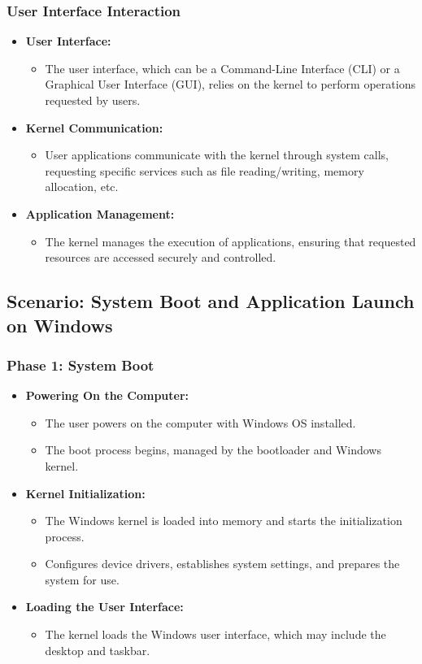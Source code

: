 \subsubsection{User Interface Interaction}
\begin{itemize}
    \item \textbf{User Interface:}
    \begin{itemize}
        \item The user interface, which can be a Command-Line Interface (CLI) or a Graphical User Interface (GUI), relies on the kernel to perform operations requested by users.
    \end{itemize}
    \item \textbf{Kernel Communication:}
    \begin{itemize}
        \item User applications communicate with the kernel through system calls, requesting specific services such as file reading/writing, memory allocation, etc.
    \end{itemize}
    \item \textbf{Application Management:}
    \begin{itemize}
        \item The kernel manages the execution of applications, ensuring that requested resources are accessed securely and controlled.
    \end{itemize}
\end{itemize}

\subsection{Scenario: System Boot and Application Launch on Windows}
\subsubsection{Phase 1: System Boot}
\begin{itemize}
    \item \textbf{Powering On the Computer:}
    \begin{itemize}
        \item The user powers on the computer with Windows OS installed.
        \item The boot process begins, managed by the bootloader and Windows kernel.
    \end{itemize}
    \item \textbf{Kernel Initialization:}
    \begin{itemize}
        \item The Windows kernel is loaded into memory and starts the initialization process.
        \item Configures device drivers, establishes system settings, and prepares the system for use.
    \end{itemize}
    \item \textbf{Loading the User Interface:}
    \begin{itemize}
        \item The kernel loads the Windows user interface, which may include the desktop and taskbar.
    \end{itemize}
\end{itemize}

